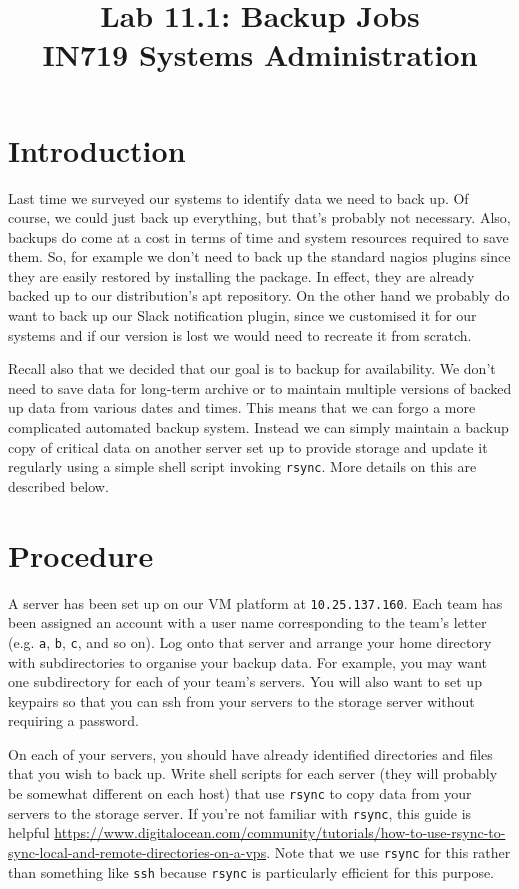 \documentclass{article}   	%
\title{Lab 11.1:  Backup Jobs\\ IN719 Systems Administration}
\date{}							%
\begin{document}
\maketitle

\section*{Introduction}
Last time we surveyed our systems to identify data we need to back up. Of course, we could just back up everything, but that's probably not necessary. Also, backups do come at a cost in terms of time and system resources required to save them. So, for example we don't need to back up the standard nagios plugins since they are easily restored by installing the package. In effect, they are already backed up to our distribution's apt repository. On the other hand we probably do want to back up our Slack notification plugin, since we customised it for our systems and if our version is lost we would need to recreate it from scratch.

Recall also that we decided that our goal is to backup for availability. We don't need to save data for long-term archive or to maintain multiple versions of backed up data from various dates and times. This means that we can forgo a more complicated automated backup system. Instead we can simply maintain a backup copy of critical data on another server set up to provide storage and update it regularly using a simple shell script invoking \texttt{rsync}. More details on this are described below.

\section{Procedure}
A server has been set up on our VM platform at \texttt{10.25.137.160}. Each team has been assigned an account with a user name corresponding to the team's letter (e.g. \texttt{a}, \texttt{b}, \texttt{c}, and so on). Log onto that server and arrange your home directory with subdirectories to organise your backup data. For example, you may want one subdirectory for each of your team's servers. You will also want to set up keypairs so that you can ssh from your servers to the storage server without requiring a password.

On each of your servers, you should have already identified directories and files that you wish to back up. Write shell scripts for each server (they will probably be somewhat different on each host) that use \texttt{rsync} to copy data from your servers to the storage server. If you're not familiar with \texttt{rsync}, this guide is helpful \url{https://www.digitalocean.com/community/tutorials/how-to-use-rsync-to-sync-local-and-remote-directories-on-a-vps}. Note that we use \texttt{rsync} for this rather than something like \texttt{ssh} because \texttt{rsync} is particularly efficient for this purpose.
\end{document}
